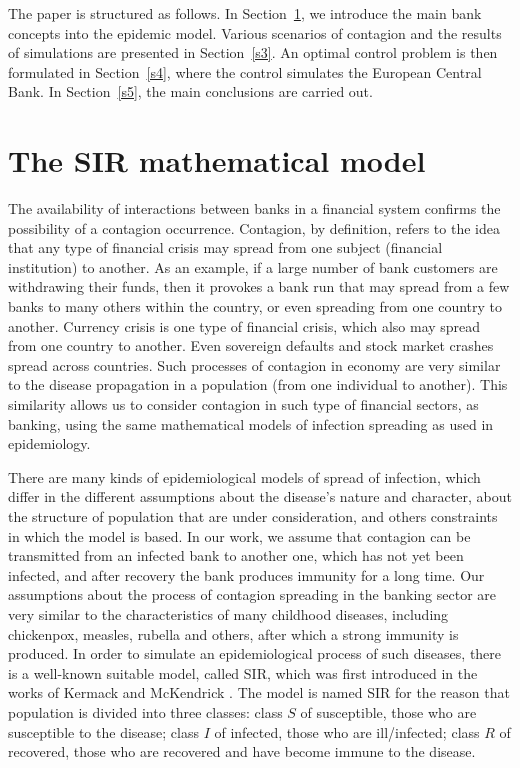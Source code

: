 \documentclass[a4paper,10pt,twoside]{article}
\begin{document}
The paper is structured as follows. In Section~\ref{s2}, 
we introduce the main bank concepts into the epidemic model. 
Various scenarios of contagion and the results of simulations  
are presented in Section~\ref{s3}. An optimal control problem
is then formulated in Section~\ref{s4}, where the control 
simulates the European Central Bank. In Section~\ref{s5}, 
the main conclusions are carried out.


\section{The SIR mathematical model}
\label{s2}

The availability of interactions between banks in a financial system
confirms the possibility of a contagion occurrence. 
Contagion, by definition, refers to the idea that any type of financial crisis
may spread from one subject (financial institution) to another. 
As an example, if a large number of bank customers are withdrawing their funds,
then it provokes a bank run that may spread from a few banks to many others 
within the country, or even spreading from one country to another. 
Currency crisis is one type of financial crisis, which also may spread 
from one country to another. Even sovereign defaults and stock market crashes 
spread across countries. Such processes of contagion in economy are very similar 
to the disease propagation in a population (from one individual to another). 
This similarity allows us to consider contagion in such type of financial sectors, 
as banking, using the same mathematical models of infection spreading as used in epidemiology.

There are many kinds of epidemiological models of spread of infection, 
which differ in the different assumptions about the disease's nature and character, 
about the structure of population that are under consideration, and others constraints 
in which the model is based. In our work, we assume that contagion can be transmitted
from an infected bank to another one, which has not yet been infected, and after recovery 
the bank produces immunity for a long time. Our assumptions about the process of contagion 
spreading in the banking sector are very similar to the characteristics of many childhood diseases, 
including chickenpox, measles, rubella and others, after which a strong immunity is produced. 
In order to simulate an epidemiological process of such diseases, there is a well-known suitable model, 
called SIR, which was first introduced in the works of Kermack and McKendrick \cite{[21]}. 
The model is named SIR for the reason that population is divided into three classes:
class $S$ of susceptible, those who are susceptible to the disease; class $I$ of infected,
those who are ill/infected; class $R$ of recovered, those who are recovered 
and have become immune to the disease.
\end{document}
